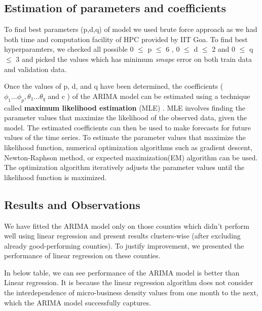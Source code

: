 \documentclass{article}
\begin{document}
\subsection{Estimation of parameters and coefficients}

To find best parameters (p,d,q) of model we used brute force approach as we had both time and computation facility of HPC provided by IIT Goa.  To find best hyperparamters, we checked all possible 0 $\le$ p $\le$ 6 , 0 $\le$ d $\le$ 2 and 0 $\le$ q $\le$ 3 and picked the values which has minimum \textit{smape} error on both train data and validation data.  

\vspace{1em}
Once the values of p, d, and q have been determined, the coefficients ($\phi_1 \ldots \phi_p , \theta_1 \ldots \theta_q$ and c ) of the ARIMA model can be estimated using a technique called\textbf{ maximum likelihood estimation} (MLE) \cite{mle}. MLE involves finding the parameter values that maximize the likelihood of the observed data, given the model. The estimated coefficients can then be used to make forecasts for future values of the time series. To estimate the parameter values that maximize the likelihood function, numerical optimization algorithms such as gradient descent, Newton-Raphson method, or expected maximization(EM) algorithm can be used. The optimization algorithm iteratively adjusts the parameter values until the likelihood function is maximized. 

\vspace{1em}
\subsection{Results and Observations}

We have fitted the ARIMA model only on those counties which didn't perform well using linear regression and present results clusters-wise (after excluding already good-performing counties). To justify improvement, we presented the performance of linear regression on these counties. 

\vspace{1em}
In below table, we can see performance of the ARIMA model is better than Linear regression. It is because the linear regression algorithm does not consider the interdependence of micro-business density values from one month to the next, which the ARIMA model successfully captures.  

\vspace{1em}
\end{document}
